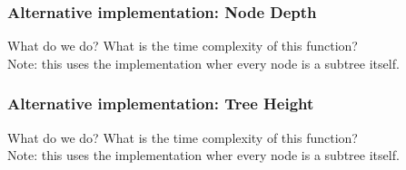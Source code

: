 \begin{frame}
	\frametitle{Alternative implementation: Node Depth}
	
	
	\begin{questionblock}{What do we do?}
		What is the time complexity of this function?\\
		Note: this uses the implementation wher every node is a subtree itself.
		\only<2>{
		\begin{multicols}{2}
			\begin{enumerate}[A.]
				\item $\Theta(h)$
				\item $\Theta(h^2)$
				\item $\Theta(n)$
				\item $\Theta(n^2)$
			\end{enumerate}
		\end{multicols}
	}
	\end{questionblock}
\end{frame}

\begin{frame}
	\frametitle{Alternative implementation: Tree Height}
	
	\begin{questionblock}{What do we do?}
		What is the time complexity of this function?\\
		Note: this uses the implementation wher every node is a subtree itself.
		\only<2>{
		\begin{multicols}{2}
			\begin{enumerate}[A.]
				\item $\Theta(h)$
				\item $\Theta(h^2)$
				\item $\Theta(n)$
				\item $\Theta(n^2)$
			\end{enumerate}
		\end{multicols}
	}
	\end{questionblock}
\end{frame}


